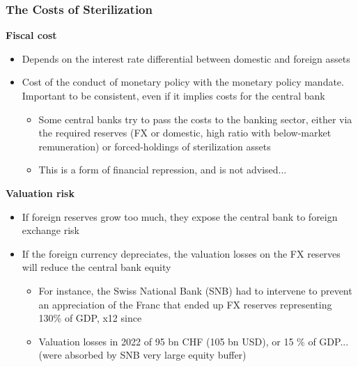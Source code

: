 \documentclass{beamer}
\newenvironment{wideitemize}{\itemize\addtolength{\itemsep}{10pt}}{\enditemize}
\begin{document}
\begin{frame}
  \frametitle{The Costs of Sterilization}
  \begin{wideitemize}
    
  \item \textbf{Fiscal cost}
    \begin{itemize}
    \item Depends on the interest rate differential between domestic and foreign assets
    \item Cost of the conduct of monetary policy with the monetary policy mandate. Important to be consistent, even if it implies costs for the central bank
      \begin{itemize}
      \item Some central banks try to pass the costs to the banking sector, either via the required reserves (FX or domestic, high ratio with below-market remuneration) or forced-holdings of sterilization assets
      \item This is a form of financial repression, and is not advised...
      \end{itemize}
    \end{itemize}
    
  \item \textbf{Valuation risk}
    \begin{itemize}
    \item If foreign reserves grow too much, they expose the central bank to foreign exchange risk
    \item If the foreign currency depreciates, the valuation losses on the FX reserves will reduce the central bank equity
      \begin{itemize}
      \item For instance, the Swiss National Bank (SNB) had to intervene to prevent an appreciation of the Franc that ended up FX reserves representing 130\% of GDP, x12 since 
       \item Valuation losses in 2022 of 95 bn CHF (105 bn USD), or 15 \% of GDP... (were absorbed by SNB very large equity buffer)
      \end{itemize}
    \end{itemize}
    
  \end{wideitemize}
\end{frame}
\end{document}
